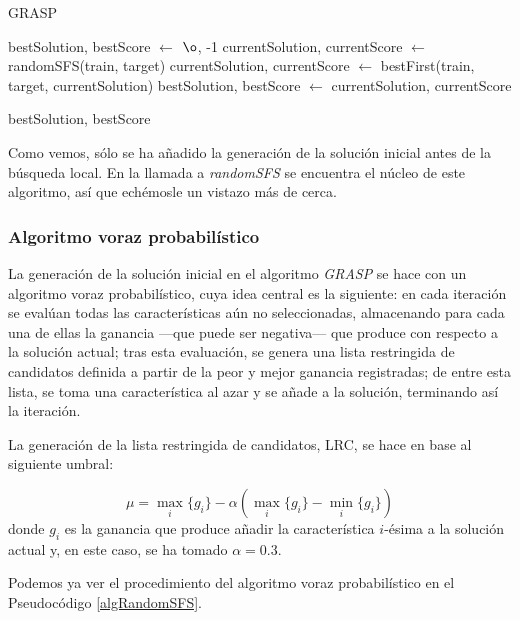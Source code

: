 \documentclass[a4paper, 11pt, titlepage]{article}
\begin{document}
    \begin{algorithm}
        \caption{GRASP}\label{algGRASP}
        \begin{algorithmic}[1]

            \State bestSolution, bestScore $\gets$ $\o$, -1
                \State currentSolution, currentScore $\gets$ randomSFS(train, target)
                \State currentSolution, currentScore $\gets$ bestFirst(train, target, currentSolution)
                \State bestSolution, bestScore $\gets$ currentSolution, currentScore
                \EndIf
            \EndFor

            \State \Return bestSolution, bestScore
            \EndFunction
        \end{algorithmic}
    \end{algorithm}

    Como vemos, sólo se ha añadido la generación de la solución inicial antes de la búsqueda local. En la llamada a \emph{randomSFS} se encuentra el núcleo de este algoritmo, así que echémosle un vistazo más de cerca.

    \subsubsection*{Algoritmo voraz probabilístico}

    La generación de la solución inicial en el algoritmo \emph{GRASP} se hace con un algoritmo voraz probabilístico, cuya idea central es la siguiente: en cada iteración se evalúan todas las características aún no seleccionadas, almacenando para cada una de ellas la ganancia ---que puede ser negativa--- que produce con respecto a la solución actual; tras esta evaluación, se genera una lista restringida de candidatos definida a partir de la peor y mejor ganancia registradas; de entre esta lista, se toma una característica al azar y se añade a la solución, terminando así la iteración.

    La generación de la lista restringida de candidatos, LRC, se hace en base al siguiente umbral:

    \[
        \mu = \max_{i}\{g_i\} - \alpha (\max_{i}\{g_i\} - \min_{i}\{g_i\})
    \]
    donde $g_i$ es la ganancia que produce añadir la característica $i$-ésima a la solución actual y, en este caso, se ha tomado $\alpha = 0.3$.

    Podemos ya ver el procedimiento del algoritmo voraz probabilístico en el Pseudocódigo \ref{algRandomSFS}.
\end{document}
